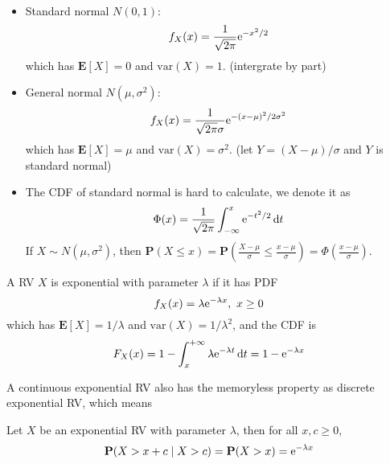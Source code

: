 \begin{definition} ~
    \begin{itemize}
        \item Standard normal $N(0, 1)$:
        \begin{equation}
            f_{X}(x) = \frac{1}{\sqrt{2\pi}} \mathrm{e}^{-x^2/2}
        \end{equation}
        which has $\mathbf{E}[X] = 0$ and $\text{var}(X) = 1$. (intergrate by part)
        \item General normal $N(\mu, \sigma^2)$:
        \begin{equation}
            f_{X}(x) = \frac{1}{\sqrt{2\pi} \sigma} \mathrm{e}^{-(x - \mu)^2/2\sigma^2}
        \end{equation}
        which has $\mathbf{E}[X] = \mu$ and $\text{var}(X) = \sigma^2$. (let $Y = (X - \mu) / \sigma$ and $Y$ is standard normal)
        \item The CDF of standard normal is hard to calculate, we denote it as 
        \begin{equation}
            \Phi(x) = \frac{1}{\sqrt{2\pi}} \int_{-\infty}^{x} \mathrm{e}^{-t^2/2} \dd{t}    
        \end{equation}
        If $X \sim N(\mu, \sigma^2)$, then $\mathbf{P}(X \leq x) = \mathbf{P}(\frac{X - \mu}{\sigma} \leq \frac{x - \mu}{\sigma}) = \Phi(\frac{x - \mu}{\sigma})$.
    \end{itemize}
\end{definition}

\begin{definition}[Exponential RV]
    A RV $X$ is exponential with parameter $\lambda$ if it has PDF
    \begin{equation}
        f_{X}(x) = \lambda \mathrm{e}^{-\lambda x},~ x \geq 0
    \end{equation}
    which has $\mathbf{E}[X] = 1 / \lambda$ and $\text{var}(X) = 1 / \lambda^2$, and the CDF is
    \begin{equation}
        F_{X}(x) = 1 - \int_{x}^{+\infty} \lambda \mathrm{e}^{-\lambda t} \dd{t} = 1 - \mathrm{e}^{-\lambda x}
    \end{equation}
\end{definition}

A continuous exponential RV also has the memoryless property as discrete exponential RV, which means
\begin{property}
    Let $X$ be an exponential RV with parameter $\lambda$, then for all $x, c \geq 0$,
    \begin{equation}
        \mathbf{P}(X > x + c \mid X > c) = \mathbf{P}(X > x) = \mathrm{e}^{-\lambda x}
    \end{equation}
\end{property}

